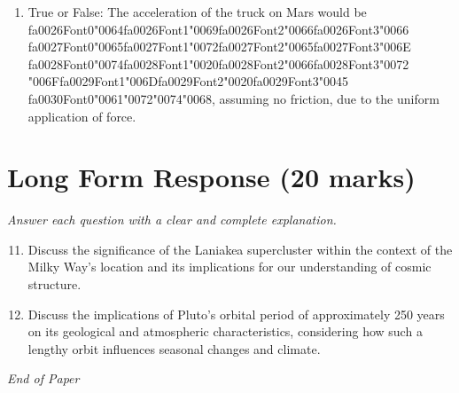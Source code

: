 \documentclass[12pt]{article}
\begin{document}
\begin{enumerate}[label=\arabic*.]
\item True or False: The acceleration of the truck on Mars would be {\csname fa0026Font0\endcsname\char"0064}{\csname fa0026Font1\endcsname\char"0069}{\csname fa0026Font2\endcsname\char"0066}{\csname fa0026Font3\endcsname\char"0066} {\csname fa0027Font0\endcsname\char"0065}{\csname fa0027Font1\endcsname\char"0072}{\csname fa0027Font2\endcsname\char"0065}{\csname fa0027Font3\endcsname\char"006E} {\csname fa0028Font0\endcsname\char"0074}{\csname fa0028Font1\endcsname\char"0020}{\csname fa0028Font2\endcsname\char"0066}{\csname fa0028Font3\endcsname\char"0072} {\char"006F}{\csname fa0029Font1\endcsname\char"006D}{\csname fa0029Font2\endcsname\char"0020}{\csname fa0029Font3\endcsname\char"0045} {\csname fa0030Font0\endcsname\char"0061}{\char"0072}{\char"0074}{\char"0068}, assuming no friction, due to the uniform application of force.
\end{enumerate}

\section*{Long Form Response (20 marks)}
\textit{Answer each question with a clear and complete explanation.}
\begin{enumerate}[label=\arabic*.]
\setcounter{enumi}{10}
\item Discuss the significance of the Laniakea supercluster within the context of the Milky
Way's location and its implications for our understanding of cosmic structure.
\item Discuss the implications of Pluto's orbital period of approximately 250 years on its
geological and atmospheric characteristics, considering how such a lengthy orbit
influences seasonal changes and climate.
\end{enumerate}

\vfill
\noindent\textit{End of Paper}
\end{document}
